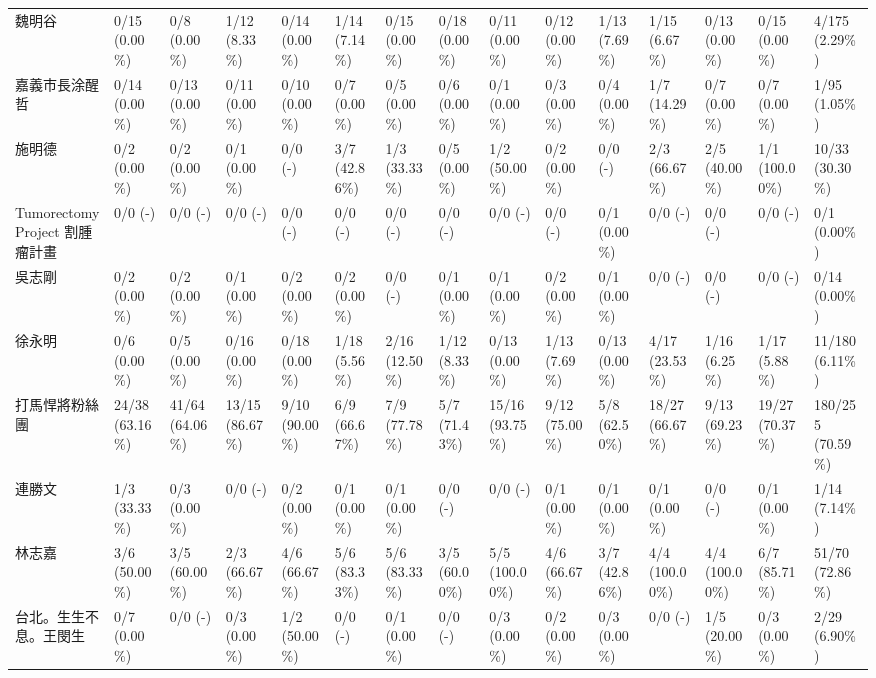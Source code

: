 \documentclass[letterpaper, 10pt, conference]{ieeeconf}   %
\begin{document}
\begin{CJK}{UTF8}{bsmi}
\begin{landscape}
\begin{longtable}[c]{@{}L{2.45cm}L{1.1cm}L{1.1cm}L{1.1cm}L{1.1cm}L{1.1cm}L{1.1cm}L{1.1cm}L{1.1cm}L{1.1cm}L{1.1cm}L{1.1cm}L{1.1cm}L{1.1cm}L{1.1cm}@{}}
魏明谷 & 0/15 (0.00\%) & 0/8 (0.00\%) & 1/12 (8.33\%) & 0/14 (0.00\%) & 1/14 (7.14\%) & 0/15 (0.00\%) & 0/18 (0.00\%) & 0/11 (0.00\%) & 0/12 (0.00\%) & 1/13 (7.69\%) & 1/15 (6.67\%) & 0/13 (0.00\%) & 0/15 (0.00\%) & 4/175 (2.29\%) \\
嘉義市長涂醒哲 & 0/14 (0.00\%) & 0/13 (0.00\%) & 0/11 (0.00\%) & 0/10 (0.00\%) & 0/7 (0.00\%) & 0/5 (0.00\%) & 0/6 (0.00\%) & 0/1 (0.00\%) & 0/3 (0.00\%) & 0/4 (0.00\%) & 1/7 (14.29\%) & 0/7 (0.00\%) & 0/7 (0.00\%) & 1/95 (1.05\%) \\
施明德 & 0/2 (0.00\%) & 0/2 (0.00\%) & 0/1 (0.00\%) & 0/0 (-) & 3/7 (42.86\%) & 1/3 (33.33\%) & 0/5 (0.00\%) & 1/2 (50.00\%) & 0/2 (0.00\%) & 0/0 (-) & 2/3 (66.67\%) & 2/5 (40.00\%) & 1/1 (100.00\%) & 10/33 (30.30\%) \\
Tumorectomy Project 割腫瘤計畫 & 0/0 (-) & 0/0 (-) & 0/0 (-) & 0/0 (-) & 0/0 (-) & 0/0 (-) & 0/0 (-) & 0/0 (-) & 0/0 (-) & 0/1 (0.00\%) & 0/0 (-) & 0/0 (-) & 0/0 (-) & 0/1 (0.00\%) \\
吳志剛 & 0/2 (0.00\%) & 0/2 (0.00\%) & 0/1 (0.00\%) & 0/2 (0.00\%) & 0/2 (0.00\%) & 0/0 (-) & 0/1 (0.00\%) & 0/1 (0.00\%) & 0/2 (0.00\%) & 0/1 (0.00\%) & 0/0 (-) & 0/0 (-) & 0/0 (-) & 0/14 (0.00\%) \\
徐永明 & 0/6 (0.00\%) & 0/5 (0.00\%) & 0/16 (0.00\%) & 0/18 (0.00\%) & 1/18 (5.56\%) & 2/16 (12.50\%) & 1/12 (8.33\%) & 0/13 (0.00\%) & 1/13 (7.69\%) & 0/13 (0.00\%) & 4/17 (23.53\%) & 1/16 (6.25\%) & 1/17 (5.88\%) & 11/180 (6.11\%) \\
打馬悍將粉絲團 & 24/38 (63.16\%) & 41/64 (64.06\%) & 13/15 (86.67\%) & 9/10 (90.00\%) & 6/9 (66.67\%) & 7/9 (77.78\%) & 5/7 (71.43\%) & 15/16 (93.75\%) & 9/12 (75.00\%) & 5/8 (62.50\%) & 18/27 (66.67\%) & 9/13 (69.23\%) & 19/27 (70.37\%) & 180/255 (70.59\%) \\
連勝文 & 1/3 (33.33\%) & 0/3 (0.00\%) & 0/0 (-) & 0/2 (0.00\%) & 0/1 (0.00\%) & 0/1 (0.00\%) & 0/0 (-) & 0/0 (-) & 0/1 (0.00\%) & 0/1 (0.00\%) & 0/1 (0.00\%) & 0/0 (-) & 0/1 (0.00\%) & 1/14 (7.14\%) \\
林志嘉 & 3/6 (50.00\%) & 3/5 (60.00\%) & 2/3 (66.67\%) & 4/6 (66.67\%) & 5/6 (83.33\%) & 5/6 (83.33\%) & 3/5 (60.00\%) & 5/5 (100.00\%) & 4/6 (66.67\%) & 3/7 (42.86\%) & 4/4 (100.00\%) & 4/4 (100.00\%) & 6/7 (85.71\%) & 51/70 (72.86\%) \\
台北。生生不息。王閔生 & 0/7 (0.00\%) & 0/0 (-) & 0/3 (0.00\%) & 1/2 (50.00\%) & 0/0 (-) & 0/1 (0.00\%) & 0/0 (-) & 0/3 (0.00\%) & 0/2 (0.00\%) & 0/3 (0.00\%) & 0/0 (-) & 1/5 (20.00\%) & 0/3 (0.00\%) & 2/29 (6.90\%) \\

\end{longtable}
\end{landscape}
\end{CJK}
\end{document}

